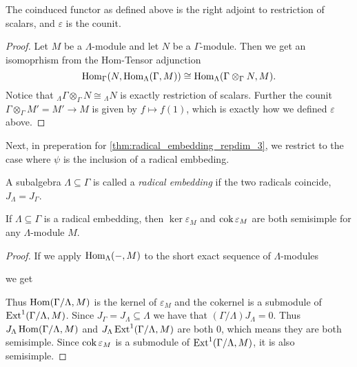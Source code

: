 \begin{prop}\cite[Lemma~2.2]{EHIS04}\label{prop:coinduction_right_adjoint}
	The coinduced functor as defined above is the right adjoint to restriction of scalars, and $\varepsilon$ is the counit.
	\begin{proof}
		Let $M$ be a $\Lambda$-module and let $N$ be a $\Gamma$-module. Then we get an isomoprhism from the Hom-Tensor adjunction 
		$$\operatorname{Hom}_\Gamma(N, \operatorname{Hom}_\Lambda(\Gamma, M)) \cong \operatorname{Hom}_\Lambda(\Gamma\otimes_\Gamma N, M).$$
		Notice that $_\Lambda\Gamma\otimes_\Gamma N \cong {{}_\Lambda N}$ is exactly restriction of scalars. Further the counit $\Gamma\otimes_\Gamma M' = M' \to M$ is given by $f\mapsto f(1)$, which is exactly how we defined $\varepsilon$ above.
	\end{proof}
\end{prop}

Next, in preperation for \cref{thm:radical_embedding_repdim_3}, we restrict to the case where $\psi$ is the inclusion of a radical embbeding.

\begin{defn}
	A subalgebra $\Lambda \subseteq \Gamma$ is called a \emph{radical embedding} if the two radicals coincide, $J_\Lambda = J_\Gamma$.
\end{defn}

\begin{lemma}\cite[Lemma~2.3]{EHIS04}\label{lem:epsilon_semisimple_(co)kernel}
	If $\Lambda \subseteq \Gamma$ is a radical embedding, then $\ker \varepsilon_M$ and $\operatorname{cok}\varepsilon_M$ are both semisimple for any $\Lambda$-module $M$.
	\begin{proof}
		If we apply $\operatorname{Hom}_\Lambda(-, M)$ to the short exact sequence of $\Lambda$-modules  we get 
		\begin{center}
		\end{center}
		Thus $\operatorname{Hom}(\Gamma/\Lambda, M)$ is the kernel of $\varepsilon_M$ and the cokernel is a submodule of $\operatorname{Ext}^1(\Gamma/\Lambda, M)$. Since $J_\Gamma = J_\Lambda \subseteq \Lambda$ we have that $(\Gamma/\Lambda)J_\Lambda = 0$. Thus $J_\Lambda\operatorname{Hom}(\Gamma/\Lambda, M)$ and $J_\Lambda\operatorname{Ext}^1(\Gamma/\Lambda, M)$ are both 0, which means they are both semisimple. Since $\operatorname{cok}\varepsilon_M$ is a submodule of $\operatorname{Ext}^1(\Gamma/\Lambda, M)$, it is also semisimple.
	\end{proof}
\end{lemma}


